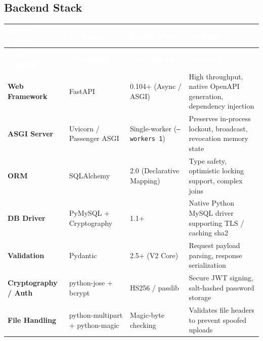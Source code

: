 \documentclass[11pt,a4paper]{article}
\newcommand{\theadstyle}[1]{\textcolor{white}{\bfseries #1}}
\renewcommand{\arraystretch}{1.35}
\begin{document}
\subsection{Backend Stack}
\renewcommand{\arraystretch}{1.3}
\begin{longtable}{>{\bfseries}L{2.9cm} L{2.6cm} L{3.0cm} L{4.3cm}}
\theadstyle{Layer / Concern} & \theadstyle{Technology} & \theadstyle{Specification} & \theadstyle{Rationale} \\
\endfirsthead
{}
\theadstyle{Layer / Concern} & \theadstyle{Technology} & \theadstyle{Specification} & \theadstyle{Rationale} \\
\endhead
Web Framework & FastAPI & 0.104+ (Async / ASGI) & High throughput, native OpenAPI generation, dependency injection \\
ASGI Server & Uvicorn / Passenger ASGI & Single-worker (\texttt{--workers 1}) & Preserves in-process lockout, broadcast, revocation memory state \\
ORM & SQLAlchemy & 2.0 (Declarative Mapping) & Type safety, optimistic locking support, complex joins \\
DB Driver & PyMySQL + Cryptography & 1.1+ & Native Python MySQL driver supporting TLS / caching sha2 \\
Validation & Pydantic & 2.5+ (V2 Core) & Request payload parsing, response serialization \\
Cryptography / Auth & python-jose + bcrypt & HS256 / passlib & Secure JWT signing, salt-hashed password storage \\
File Handling & python-multipart + python-magic & Magic-byte checking & Validates file headers to prevent spoofed uploads \\
\end{longtable}
\end{document}
